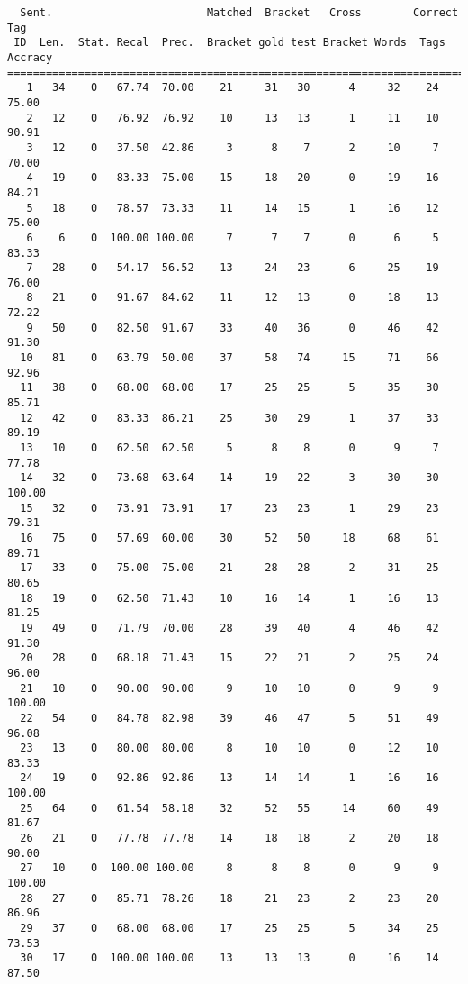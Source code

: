 \scriptsize
\begin{verbatim}
  Sent.                        Matched  Bracket   Cross        Correct Tag
 ID  Len.  Stat. Recal  Prec.  Bracket gold test Bracket Words  Tags Accracy
============================================================================
   1   34    0   67.74  70.00    21     31   30      4     32    24    75.00
   2   12    0   76.92  76.92    10     13   13      1     11    10    90.91
   3   12    0   37.50  42.86     3      8    7      2     10     7    70.00
   4   19    0   83.33  75.00    15     18   20      0     19    16    84.21
   5   18    0   78.57  73.33    11     14   15      1     16    12    75.00
   6    6    0  100.00 100.00     7      7    7      0      6     5    83.33
   7   28    0   54.17  56.52    13     24   23      6     25    19    76.00
   8   21    0   91.67  84.62    11     12   13      0     18    13    72.22
   9   50    0   82.50  91.67    33     40   36      0     46    42    91.30
  10   81    0   63.79  50.00    37     58   74     15     71    66    92.96
  11   38    0   68.00  68.00    17     25   25      5     35    30    85.71
  12   42    0   83.33  86.21    25     30   29      1     37    33    89.19
  13   10    0   62.50  62.50     5      8    8      0      9     7    77.78
  14   32    0   73.68  63.64    14     19   22      3     30    30   100.00
  15   32    0   73.91  73.91    17     23   23      1     29    23    79.31
  16   75    0   57.69  60.00    30     52   50     18     68    61    89.71
  17   33    0   75.00  75.00    21     28   28      2     31    25    80.65
  18   19    0   62.50  71.43    10     16   14      1     16    13    81.25
  19   49    0   71.79  70.00    28     39   40      4     46    42    91.30
  20   28    0   68.18  71.43    15     22   21      2     25    24    96.00
  21   10    0   90.00  90.00     9     10   10      0      9     9   100.00
  22   54    0   84.78  82.98    39     46   47      5     51    49    96.08
  23   13    0   80.00  80.00     8     10   10      0     12    10    83.33
  24   19    0   92.86  92.86    13     14   14      1     16    16   100.00
  25   64    0   61.54  58.18    32     52   55     14     60    49    81.67
  26   21    0   77.78  77.78    14     18   18      2     20    18    90.00
  27   10    0  100.00 100.00     8      8    8      0      9     9   100.00
  28   27    0   85.71  78.26    18     21   23      2     23    20    86.96
  29   37    0   68.00  68.00    17     25   25      5     34    25    73.53
  30   17    0  100.00 100.00    13     13   13      0     16    14    87.50

\end{verbatim}
